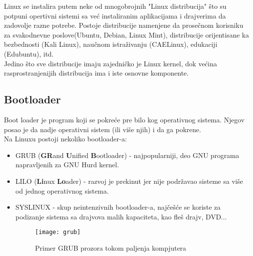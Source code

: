 Linux se instalira putem neke od mnogobrojnih "Linux distribucija" što su potpuni opertivni sistemi sa već instaliranim aplikacijama i  drajverima da zadovolje razne potrebe. Postoje distribucije namenjene da prosečnom korisniku za svakodnevne poslove(Ubuntu, Debian, Linux Mint), distribucije orijentisane ka bezbednosti (Kali Linux), naučnom istraživanju (CAELinux), edukaciji (Edubuntu), itd.\\
Jedino što sve distribucije imaju zajedničko je Linux kernel, dok većina rasprostranjenijih distribucija ima i iste osnovne komponente.

\subsection{Bootloader}
Boot loader je program koji se pokreće pre bilo kog operativnog sistema. Njegov posao je da nadje operativni sistem (ili više njih) i da ga pokrene. \\Na Linuxu postoji nekoliko bootloader-a:\begin{itemize}
\item GRUB (\textbf{GR}and \textbf{U}nified \textbf{B}ootloader) - najpopularniji, deo GNU programa napravljenih za GNU Hurd kernel.
\item LILO (\textbf{Li}nux \textbf{Lo}ader) - razvoj je prekinut jer nije podržavao sisteme sa više od jednog operativnog sistema.
\item SYSLINUX - skup neintenzivnih bootloader-a, najčešće se koriste za podizanje sistema sa drajvova malih kapaciteta, kao fleš drajv, DVD...
\begin{figure}[H]
	\centering
	\texttt{[image: grub]}
	\caption{Primer GRUB prozora tokom paljenja kompjutera}
\end{figure}
\end{itemize}



